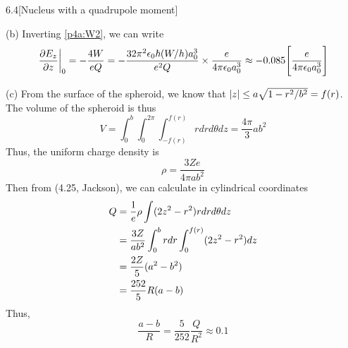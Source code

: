 \documentclass[12pt]{article}
\begin{document}
\begin{problem}{6.4}[Nucleus with a quadrupole moment]
\begin{solution}
(b) Inverting \eqref{p4a:W2}, we can write
\begin{align}
    \eval{\frac{\partial E_z}{\partial z}}_0 
    =-\frac{4W}{eQ}
    =-\frac{32\pi^2\epsilon_0\hbar
    (W/h)a_0^3}{e^2Q}\times\frac{e}{4\pi\epsilon_0a_0^3}
    \approx-0.085\qty[\frac{e}{4\pi\epsilon_0a_0^3}]
\end{align}

(c) From the surface of the spheroid, we know that $\abs{z}\leq
a\sqrt{1-r^2 /b^2}=f(r)$. The volume of the spheroid is thus
\begin{equation}
    V=\int_0^b\int_0^{2\pi}\int_{-f(r)}^{f(r)}rdrd\theta dz
    =\frac{4\pi}{3}ab^2
\end{equation}
Thus, the uniform charge density is
\begin{equation}
    \rho=\frac{3Ze}{4\pi ab^2} 
\end{equation}
Then from (4.25, Jackson), we can calculate in cylindrical coordinates
\begin{align}
    Q&=\frac1e\rho\int(2z^2-r^2)rdrd\theta dz\notag\\
     &=\frac{3Z}{ab^2}\int_0^brdr\int_0^{f(r)}(2z^2-r^2)dz\notag\\
     &=\frac{2Z}{5}(a^2-b^2)\notag\\
     &=\frac{252}{5}R(a-b)
\end{align}
Thus,
\begin{equation}
    \frac{a-b}{R}=\frac{5}{252}\frac{Q}{R^2}\approx 0.1 
\end{equation}
\end{solution}
\end{problem}
\end{document}
